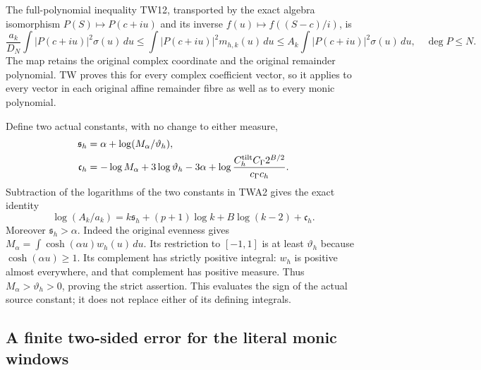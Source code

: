 The full-polynomial inequality TW12, transported by the exact algebra
isomorphism $P(S)\mapsto P(c+iu)$ and its inverse
$f(u)\mapsto f((S-c)/i)$, is
\[
\frac{a_k}{D_N}\int|P(c+iu)|^2\sigma(u)\,du
\le\int|P(c+iu)|^2m_{h,k}(u)\,du
\le A_k\int|P(c+iu)|^2\sigma(u)\,du,
\quad\deg P\le N.\tag{TWA3}
\]
The map retains the original complex coordinate and the original
remainder polynomial. TW proves this for every complex coefficient
vector, so it applies to every vector in each original affine
remainder fibre as well as to every monic polynomial.

Define two actual constants, with no change to either measure,
\[
\begin{aligned}
\mathfrak s_h&=\alpha+\log(M_\alpha/\vartheta_h),\\
\mathfrak c_h&=-\log M_\alpha+3\log\vartheta_h-3\alpha
 +\log\frac{C_h^{\rm tilt}C_\Gamma2^{B/2}}{c_\Gamma c_h}.
\end{aligned}
\]
Subtraction of the logarithms of the two constants in TWA2 gives
the exact identity
\[
\log(A_k/a_k)=k\mathfrak s_h+(p+1)\log k
                      +B\log(k-2)+\mathfrak c_h.\tag{TWA4}
\]
Moreover $\mathfrak s_h>\alpha$. Indeed the original evenness gives
$M_\alpha=\int\cosh(\alpha u)w_h(u)\,du$.
Its restriction to $[-1,1]$ is at least $\vartheta_h$ because
$\cosh(\alpha u)\ge1$. Its complement has strictly positive integral:
$w_h$ is positive almost everywhere, and that complement has positive
measure. Thus $M_\alpha>\vartheta_h>0$, proving the strict assertion.
This evaluates the sign of the actual source constant; it does not
replace either of its defining integrals.

\subsection{A finite two-sided error for the literal monic windows}

